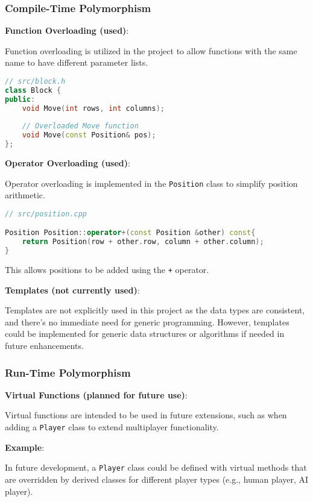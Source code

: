 \documentclass{article}
\begin{document}
\subsubsection{Compile-Time Polymorphism}

\textbf{Function Overloading (used)}:

Function overloading is utilized in the project to allow functions with the same name to have different parameter lists.

\begin{lstlisting}[language=C++]
// src/block.h
class Block {
public:
    void Move(int rows, int columns);
    
    // Overloaded Move function
    void Move(const Position& pos);
};
\end{lstlisting}

\textbf{Operator Overloading (used)}:

Operator overloading is implemented in the \texttt{Position} class to simplify position arithmetic.

\begin{lstlisting}[language=C++]
// src/position.cpp

Position Position::operator+(const Position &other) const{
    return Position(row + other.row, column + other.column);
}
\end{lstlisting}

This allows positions to be added using the \texttt{+} operator.

\textbf{Templates (not currently used)}:

Templates are not explicitly used in this project as the data types are consistent, and there's no immediate need for generic programming. However, templates could be implemented for generic data structures or algorithms if needed in future enhancements.

\subsubsection{Run-Time Polymorphism}

\textbf{Virtual Functions (planned for future use)}:

Virtual functions are intended to be used in future extensions, such as when adding a \texttt{Player} class to extend multiplayer functionality.

\textbf{Example}:

In future development, a \texttt{Player} class could be defined with virtual methods that are overridden by derived classes for different player types (e.g., human player, AI player).
\end{document}
